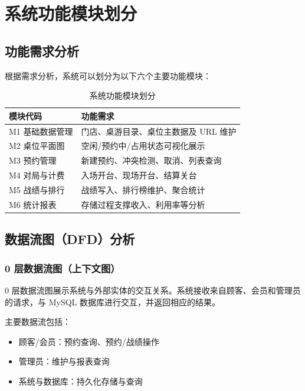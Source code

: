\chapter{系统功能模块划分}

\section{功能需求分析}

根据需求分析，系统可以划分为以下六个主要功能模块：

\begin{table}[H]
  \centering
  \caption{系统功能模块划分}
  \label{tab:modules}
  \begin{tabularx}{\textwidth}{|l|X|}
    \hline
    \textbf{模块代码} & \textbf{功能需求} \\
    \hline
    M1 基础数据管理 & 门店、桌游目录、桌位主数据及 URL 维护 \\
    \hline
    M2 桌位平面图 & 空闲/预约中/占用状态可视化展示 \\
    \hline
    M3 预约管理 & 新建预约、冲突检测、取消、列表查询 \\
    \hline
    M4 对局与计费 & 入场开台、现场开台、结算关台 \\
    \hline
    M5 战绩与排行 & 战绩写入、排行榜维护、聚合统计 \\
    \hline
    M6 统计报表 & 存储过程支撑收入、利用率等分析 \\
    \hline
  \end{tabularx}
\end{table}

\section{数据流图（DFD）分析}

\subsection{0 层数据流图（上下文图）}

0 层数据流图展示系统与外部实体的交互关系。系统接收来自顾客、会员和管理员的请求，与 MySQL 数据库进行交互，并返回相应的结果。

主要数据流包括：
\begin{itemize}
  \item 顾客/会员：预约查询、预约/战绩操作
  \item 管理员：维护与报表查询
  \item 系统与数据库：持久化存储与查询
\end{itemize}

